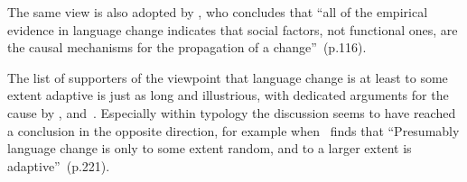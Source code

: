 
The same view is also adopted by \citet{Croft2006}, who concludes that ``all of the empirical evidence in language change indicates that social factors, not functional ones, are the causal mechanisms for the propagation of a change''~(p.116).

The list of supporters of the viewpoint that language change is at least to some extent adaptive is just as long and illustrious, with dedicated arguments for the cause by \citet{Jespersen1949}, \citet{Vennemann1993} and~\citet{Haspelmath1999,Haspelmath2008}.
Especially within typology the discussion seems to have reached a conclusion in the opposite direction, for example when~\citet{Wichmann2015} finds that ``Presumably language change is only to some extent random, and to a larger extent is adaptive''~(p.221).




